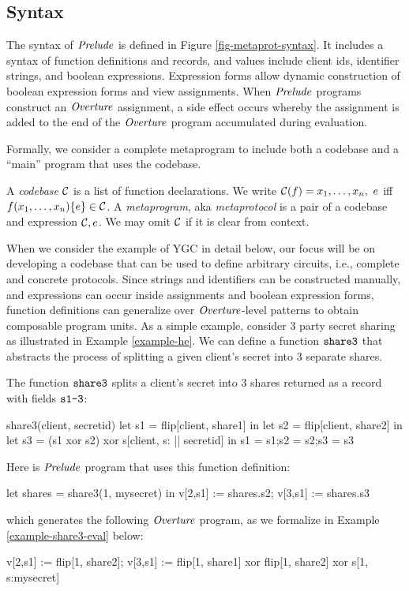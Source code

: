 \subsection{Syntax}

The syntax of $\mathit{Prelude}$ is defined in Figure
\ref{fig-metaprot-syntax}.  It includes a syntax of function
definitions and records, and values include client ids, identifier
strings, and boolean expressions. Expression forms allow dynamic
construction of boolean expression forms and view assignments. When
$\mathit{Prelude}$ programs construct an $\mathit{Overture}$ assignment, a side effect
occurs whereby the assignment is added to the end of the $\mathit{Overture}$
program accumulated during evaluation.

Formally, we consider a complete metaprogram to include both a
codebase and a ``main'' program that uses the codebase. 
\begin{definition}
A \emph{codebase} $\mathcal{C}$ is a list of function 
declarations. We write $ \mathcal{C}(f) = x_1,\ldots,x_n,\ e$
iff $f(x_1,\ldots,x_n) \{ e \} \in \mathcal{C}$.
A \emph{metaprogram}, aka \emph{metaprotocol}  is a pair of a 
codebase and expression $\mathcal{C}, e$. We may omit
$\mathcal{C}$ if it is clear from context.  
\end{definition}

When we consider the example of YGC in detail below, our focus will be
on developing a codebase that can be used to define arbitrary
circuits, i.e., complete and concrete protocols. Since strings and
identifiers can be constructed manually, and expressions can occur
inside assignments and boolean expression forms, function definitions
can generalize over $\mathit{Overture}$-level patterns to obtain composable
program units. As a simple example, consider 3 party secret
sharing as illustrated in Example \ref{example-he}. We can
define a function $\texttt{share3}$ that abstracts the process
of splitting a given client's secret into 3 separate shares.
\begin{example} \label{example-share3} The function $\texttt{share3}$ 
  splits a client's secret into 3 shares returned as a record
  with fields $\texttt{s1-3}$:
  \begin{verbatimtab}
    share3(client, secretid)
    {
      let s1 = flip[client, share1] in
      let s2 = flip[client, share2] in
      let s3 = (s1 xor s2) xor s[client, s: || secretid] in
      {s1 = s1;s2 = s2;s3 = s3}
    } \end{verbatimtab}
  Here is $\mathit{Prelude}$ program that uses this function definition:
  \begin{verbatimtab}
    let shares = share3(1, mysecret) in
    v[2,s1] := shares.s2;
    v[3,s1] := shares.s3 \end{verbatimtab}
  which generates the following $\mathit{Overture}$ program, as we formalize in Example \ref{example-share3-eval}
  below:
  \begin{verbatimtab}
    v[2,s1] := flip[1, share2];
    v[3,s1] := flip[1, share1] xor flip[1, share2] xor s[1, s:mysecret] \end{verbatimtab}
\end{example}

